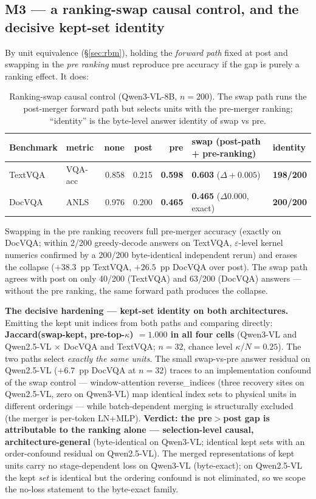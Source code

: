 \documentclass[sigconf,review,anonymous]{acmart}
\begin{document}
\subsection{M3 --- a ranking-swap causal control, and the decisive kept-set identity}\label{sec:m3}

By unit equivalence (\S\ref{sec:rbm}), holding the \emph{forward path} fixed at
post and swapping in the \emph{pre ranking} must reproduce pre accuracy if the
gap is purely a ranking effect. It does:

\begin{table}[t]
  \centering
  \small
  \caption{Ranking-swap causal control (Qwen3-VL-8B, $n = 200$). The swap path
    runs the post-merger forward path but selects units with the pre-merger
    ranking; ``identity'' is the byte-level answer identity of swap vs pre.}
  \label{tab:swap}
  \begin{tabular}{@{}l l r r r l l@{}}
    \toprule
    Benchmark & metric & none & post & \textbf{pre} & \textbf{swap} (post-path + pre-ranking) & identity \\
    \midrule
    TextVQA & VQA-acc & 0.858 & 0.215 & \textbf{0.598} & \textbf{0.603} ($\Delta +0.005$) & \textbf{198/200} \\
    DocVQA  & ANLS    & 0.976 & 0.200 & \textbf{0.465} & \textbf{0.465} ($\Delta 0.000$, exact) & \textbf{200/200} \\
    \bottomrule
  \end{tabular}
\end{table}

Swapping in the pre ranking recovers full pre-merger accuracy (exactly on
DocVQA; within 2/200 greedy-decode answers on TextVQA, $\varepsilon$-level
kernel numerics confirmed by a 200/200 byte-identical independent rerun) and
erases the collapse ($+38.3$~pp TextVQA, $+26.5$~pp DocVQA over post). The swap
path agrees with post on only 40/200 (TextVQA) and 63/200 (DocVQA) answers ---
without the pre ranking, the same forward path produces the collapse.

\textbf{The decisive hardening --- kept-set identity on both architectures.}
Emitting the kept unit indices from both paths and comparing directly:
\textbf{Jaccard(swap-kept, pre-top-$\kappa$) $= 1.000$ in all four cells}
(Qwen3-VL and Qwen2.5-VL $\times$ DocVQA and TextVQA; $n = 32$, chance level
$\kappa/N = 0.25$). The two paths select \emph{exactly the same units}. The
small swap-vs-pre answer residual on Qwen2.5-VL ($+6.7$~pp DocVQA at $n = 32$)
traces to an implementation confound of the swap control --- window-attention
reverse\_indices (three recovery sites on Qwen2.5-VL, zero on Qwen3-VL) map
identical index sets to physical units in different orderings --- while
batch-dependent merging is structurally excluded (the merger is per-token
LN+MLP). \textbf{Verdict: the pre$>$post gap is attributable to the ranking
alone --- selection-level causal, architecture-general} (byte-identical on
Qwen3-VL; identical kept sets with an order-confound residual on Qwen2.5-VL).
The merged representations of kept units carry no stage-dependent loss on
Qwen3-VL (byte-exact); on Qwen2.5-VL the kept \emph{set} is identical but the
ordering confound is not eliminated, so we scope the no-loss statement to the
byte-exact family.
\end{document}
